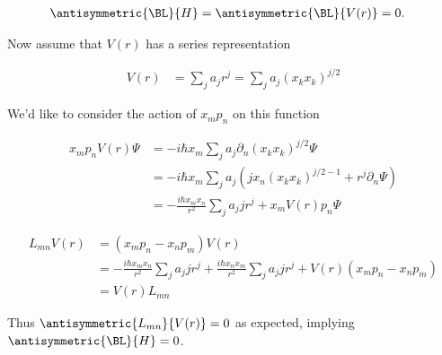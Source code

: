 \begin{align*}
\antisymmetric{\BL}{H} &= \antisymmetric{\BL}{V(r)} = 0.
\end{align*}

Now assume that $V(r)$ has a series representation

\begin{align*}
V(r) &= \sum_j a_j r^j = \sum_j a_j (x_k x_k)^{j/2}
\end{align*}

We'd like to consider the action of $x_m p_n$ on this function

\begin{align*}
x_m p_n V(r) \Psi
&= -i \hbar x_m \sum_j a_j \partial_n (x_k x_k)^{j/2} \Psi \\
&= -i \hbar x_m \sum_j a_j (j x_n (x_k x_k)^{j/2-1} + r^j \partial_n \Psi) \\
&= -\frac{i \hbar x_m x_n}{r^2} \sum_j a_j j r^j + 
x_m V(r) p_n \Psi
\end{align*}

\begin{align*}
L_{mn} V(r) 
&=
(x_m p_n - x_n p_m) V(r) \\
&= 
-\frac{i \hbar x_m x_n}{r^2} \sum_j a_j j r^j
+\frac{i \hbar x_n x_m}{r^2} \sum_j a_j j r^j 
+ 
V(r) (x_m p_n - x_n p_m )
\\
&= 
V(r) L_{mn}
\end{align*}

Thus $\antisymmetric{L_{mn}}{V(r)} = 0$ as expected, implying $\antisymmetric{\BL}{H} = 0$.

\EndArticle
